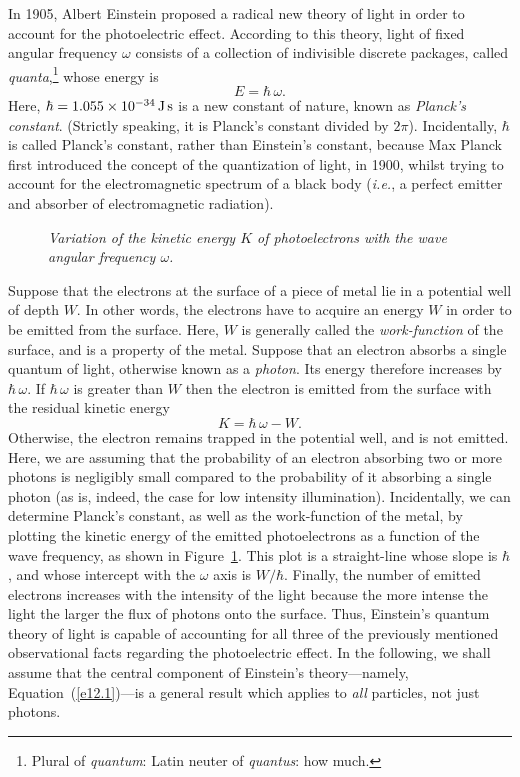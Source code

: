 In 1905, Albert Einstein proposed a radical new theory of light in order to
account for the photoelectric effect. According to this  theory, light
of  fixed angular frequency $\omega$ consists of a collection of indivisible discrete packages, called
{\em quanta},\footnote{Plural of {\em quantum}: Latin neuter
of {\em quantus}\/: how much.} whose energy is
\begin{equation}\label{e12.1}
E = \hbar\,\omega.
\end{equation}
Here, $\hbar =  1.055\times 10^{-34}\,{\rm J\,s}$ is a new constant of nature,
known as {\em Planck's constant}. (Strictly speaking, it is Planck's constant divided by $2\pi$). Incidentally, $\hbar$ is called Planck's constant, rather than Einstein's constant, because Max Planck first introduced the concept of the quantization of light, in 1900, whilst trying
to account for the  electromagnetic spectrum of a black body ({\em i.e.},
a perfect emitter and absorber of electromagnetic radiation). 

\begin{figure}
\epsfysize=3in
\centerline{}
\caption{\em Variation of the kinetic energy $K$ of photoelectrons with the wave angular frequency $\omega$.}\label{f13.1}   
\end{figure}

Suppose that the electrons at the surface of a piece of metal lie in a potential well
of depth $W$. In other words, the electrons have to acquire an energy $W$
in order to be emitted from the surface. Here, $W$ is generally called
the {\em work-function}\/ of the surface, and is a property of the
metal. Suppose that an electron absorbs a single quantum of light, otherwise known as a {\em photon}. Its energy
therefore increases by $\hbar\,\omega$. If $\hbar\,\omega$ is greater than $W$ then the
electron is emitted from the surface with the residual kinetic energy
\begin{equation}
K = \hbar\,\omega - W.
\end{equation}
Otherwise, the electron remains trapped in the potential well, and is not emitted. Here, we are assuming that the probability of an electron absorbing
two or more photons is negligibly small compared to the probability of it
absorbing a single photon (as is, indeed, the case for
low intensity illumination). Incidentally, we can determine Planck's
constant, as well as the work-function of the metal, by plotting the kinetic
energy of the emitted photoelectrons as a function of the wave frequency,
as shown in Figure~\ref{f13.1}. This plot is a straight-line whose slope is $\hbar$,
and whose intercept with the $\omega$ axis is $W/\hbar$. Finally, the number
of emitted electrons increases with the intensity of the light because the
more intense the light the larger the flux of photons onto the surface.
Thus, Einstein's quantum theory of light is capable of accounting for all
three of the previously mentioned observational facts regarding the photoelectric
effect. In the following, we shall assume that  the central component of Einstein's theory---namely, Equation~(\ref{e12.1})---is a general result which applies to {\em all}\/ particles,   not
just photons. 

